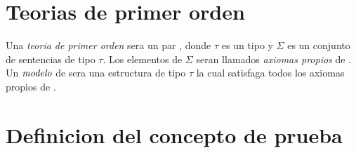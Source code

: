 
\section{Teorias de primer orden}
\begin{definition}
  Una \emph{teoria de primer orden} sera un par \forder, donde $\tau$ es un tipo
  y $\Sigma$ es un conjunto de sentencias de tipo $\tau$. Los elementos de $\Sigma$ seran llamados
  \emph{axiomas propios} de \forder. Un $\emph{modelo}$ de \forder sera una estructura de tipo $\tau$
  la cual satisfaga todos los axiomas propios de \forder.
\end{definition}

\section{Definicion del concepto de prueba}

